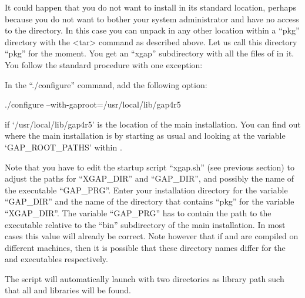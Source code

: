 It could happen that you do not want to install {\XGAP} in its
standard location, perhaps because you do not want to bother your
system administrator and have no access to the {\GAP} directory. In
this case you can unpack {\XGAP} in any other location within a
``pkg'' directory with the <tar> command as described above. Let us
call this directory ``pkg'' for the moment. You get an ``xgap''
subdirectory with all the files of {\XGAP} in it. You follow the
standard procedure with one exception:

In the ``./configure'' command, add the following option:

\begintt
./configure --with-gaproot=/usr/local/lib/gap4r5
\endtt

if `/usr/local/lib/gap4r5' is the location of the main {\GAP} installation.
You can find out where the main {} installation is by starting 
{\GAP} as usual and looking at the variable `GAP_ROOT_PATHS' 
within {\GAP}.

Note that you have to edit the startup script ``xgap.sh'' (see previous 
section) to
adjust the paths for ``XGAP_DIR'' and ``GAP_DIR'', and possibly the
name of the {\GAP} executable ``GAP_PRG''.  Enter your {\GAP}
installation directory for the variable ``GAP_DIR'' and the name of
the directory that contains ``pkg'' for the variable ``XGAP_DIR''. The 
variable ``GAP_PRG'' has to contain the path to the {\GAP} executable relative
to the ``bin'' subdirectory of the main {\GAP} installation. In most cases
this value will already be correct. Note however that if {\GAP} and {\XGAP} 
are compiled on different machines, then it is possible that these directory
names differ for the {\GAP} and {\XGAP} executables respectively. 

The script will automatically launch {\GAP} with two directories as
library path such that all {\GAP} and {\XGAP} libraries will be found.

